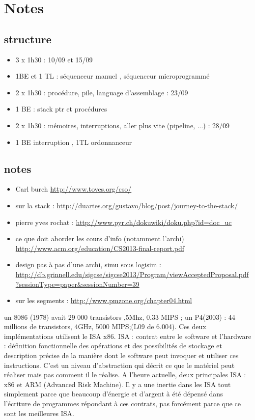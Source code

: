 \chapter{Notes}

\section{structure}
\begin{itemize}
\item 3 x 1h30 : 10/09 et 15/09
\item 1BE et 1 TL : séquenceur manuel , séquenceur microprogrammé
\item 2 x 1h30 : procédure, pile, language d'assemblage : 23/09
\item 1 BE : stack ptr et procédures
\item 2 x 1h30 : mémoires, interruptions, aller plus vite (pipeline, ...) : 28/09
\item 1 BE interruption , 1TL ordonnanceur
\end{itemize}


\section{notes}

\begin{itemize}
\item Carl burch \url{http://www.toves.org/cso/}
\item sur la stack :  \url{http://duartes.org/gustavo/blog/post/journey-to-the-stack/}
\item pierre yves rochat : \url{http://www.pyr.ch/dokuwiki/doku.php?id=doc_uc}
\item ce que doit aborder les cours d'info (notamment l'archi) \url{http://www.acm.org/education/CS2013-final-report.pdf}
\item design pas à pas d'une archi, simu sous logisim : \url{http://db.grinnell.edu/sigcse/sigcse2013/Program/viewAcceptedProposal.pdf?sessionType=paper&sessionNumber=39}
\item sur les segments : \url{http://www.pmzone.org/chapter04.html}
\end{itemize}

un 8086 (1978) avait 29 000 transistors ,5Mhz, 0.33 MIPS ; un P4(2003) : 44 millions de transistors, 4GHz, 5000 MIPS;(L09 de 6.004). Ces deux implémentations utilisent le ISA x86. ISA : contrat entre le software et l'hardware : définition fonctionnelle des opérations et des possibilités de stockage et description précise de la manière dont le software peut invoquer et utiliser ces instructions. C'est un niveau d'abstraction qui décrit ce que le matériel peut réaliser mais pas comment il le réalise. A l'heure actuelle, deux principales ISA : x86 et ARM (Advanced Risk Machine). Il y a une inertie dans les ISA tout simplement parce que beaucoup d'énergie et d'argent à été dépensé dans l'écriture de programmes répondant à ces contrats, pas forcément parce que ce sont les meilleures ISA.\\

